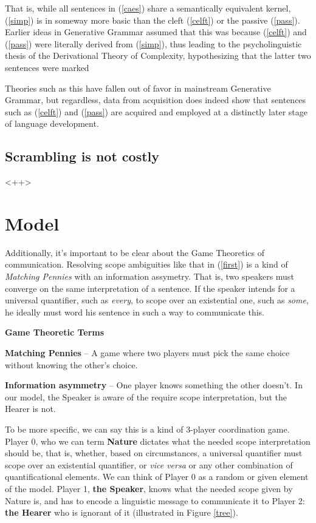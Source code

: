 \documentclass{article}
\begin{document}
That is, while all sentences in (\ref{caes}) share a semantically equivalent kernel, (\ref{simp}) is in someway more basic than the cleft (\ref{celft}) or the passive (\ref{pass}).
Earlier ideas in Generative Grammar assumed that this was because (\ref{celft}) and (\ref{pass}) were literally derived from (\ref{simp}), thus leading to the psycholinguistic thesis of the Derivational Theory of Complexity, hypothesizing that the latter two sentences were marked

Theories such as this have fallen out of favor in mainstream Generative Grammar, but regardless, data from acquisition does indeed show that sentences such as (\ref{celft}) and (\ref{pass}) are acquired and employed at a distinctly later stage of language development.


\subsection{Scrambling is not costly}

<++>

\section{Model}

Additionally, it's important to be clear about the Game Theoretics of communication.
Resolving scope ambiguities like that in (\ref{first}) is a kind of \emph{Matching Pennies} with an information assymetry.
That is, two speakers must converge on the same interpretation of a sentence.
If the speaker intends for a universal quantifier, such as \emph{every}, to scope over an existential one, such as \emph{some}, he ideally must word his sentence in such a way to communicate this.

\begin{framed}
	\small

	\textbf{Game Theoretic Terms}

	\textbf{Matching Pennies} -- A game where two players must pick the same choice without knowing the other's choice.

	\textbf{Information asymmetry} -- One player knows something the other doesn't. In our model, the Speaker is aware of the require scope interpretation, but the Hearer is not.
\end{framed}

To be more specific, we can say this is a kind of 3-player coordination game.
Player 0, who we can term \textbf{Nature} dictates what the needed scope interpretation should be, that is, whether, based on circumstances, a universal quantifier must scope over an existential quantifier, or \emph{vice versa} or any other combination of quantificational elements.
We can think of Player 0 as a random or given element of the model.
Player 1, \textbf{the Speaker}, knows what the needed scope given by Nature is, and has to encode a linguistic message to communicate it to Player 2: \textbf{the Hearer} who is ignorant of it (illustrated in Figure \ref{tree}).
\end{document}
